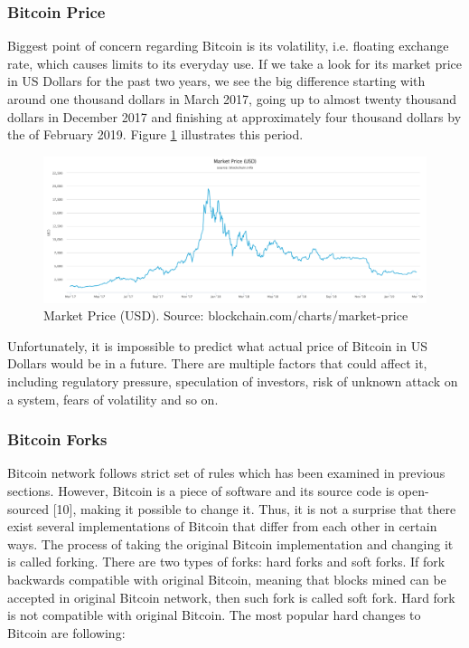 \documentclass[conference,compsoc]{IEEEtran}
\begin{document}
\subsubsection{Bitcoin Price}
Biggest point of concern regarding Bitcoin is its volatility, i.e.  floating exchange rate, which causes limits to its everyday use.
If we take a look for its market price in US Dollars for the past two years, we see the big difference starting with around one thousand dollars in March 2017, going up to almost twenty thousand dollars in December 2017 and finishing at approximately four thousand dollars by the of February 2019. 
Figure \ref{fig:price} illustrates this period.

\begin{figure}[h!]
  \centering
  \includegraphics[width=.45\textwidth]{graphics/price.png}
  \caption[Caption]{Market Price (USD). Source: blockchain.com/charts/market-price}
  \label{fig:price}
\end{figure}

Unfortunately, it is impossible to predict what actual price of Bitcoin in US Dollars would be in a future. 
There are multiple factors that could affect it, including regulatory pressure, speculation of investors, risk of unknown attack on a system, fears of volatility and so on. 


\subsubsection{Bitcoin Forks}
Bitcoin network follows strict set of rules which has been examined in previous sections.
However, Bitcoin is a piece of software and its source code is open-sourced [10], making it possible to change it. 
Thus, it is not a surprise that there exist several implementations of Bitcoin that differ from each other in certain ways.
The process of taking the original Bitcoin implementation and changing it is called forking. 
There are two types of forks: hard forks and soft forks. 
If fork backwards compatible with original Bitcoin, meaning that blocks mined can be accepted in original Bitcoin network, then such fork is called soft fork. 
Hard fork is not compatible with original Bitcoin. 
The most popular hard changes to Bitcoin are following:
\end{document}
